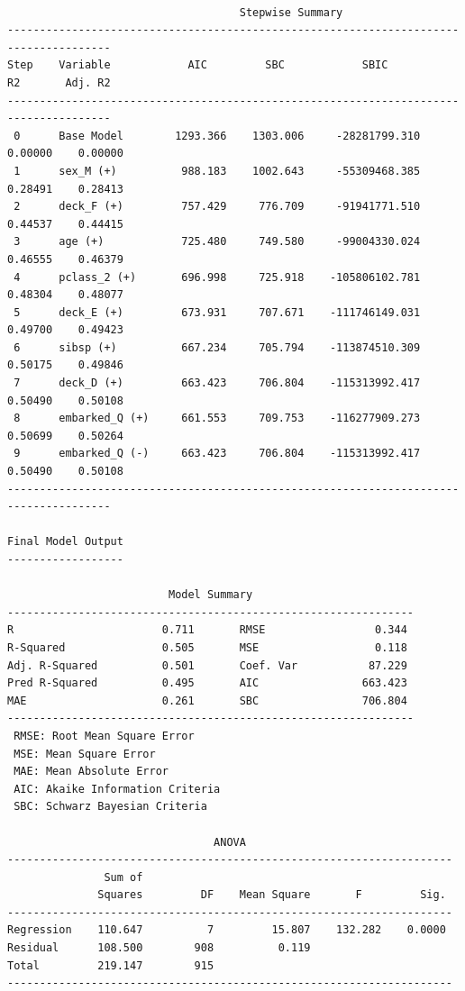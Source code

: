 \documentclass[
  letterpaper,
  DIV=11,
  numbers=noendperiod]{scrartcl}
\begin{document}
\begin{verbatim}

                                    Stepwise Summary                                    
--------------------------------------------------------------------------------------
Step    Variable            AIC         SBC            SBIC           R2       Adj. R2 
--------------------------------------------------------------------------------------
 0      Base Model        1293.366    1303.006     -28281799.310    0.00000    0.00000 
 1      sex_M (+)          988.183    1002.643     -55309468.385    0.28491    0.28413 
 2      deck_F (+)         757.429     776.709     -91941771.510    0.44537    0.44415 
 3      age (+)            725.480     749.580     -99004330.024    0.46555    0.46379 
 4      pclass_2 (+)       696.998     725.918    -105806102.781    0.48304    0.48077 
 5      deck_E (+)         673.931     707.671    -111746149.031    0.49700    0.49423 
 6      sibsp (+)          667.234     705.794    -113874510.309    0.50175    0.49846 
 7      deck_D (+)         663.423     706.804    -115313992.417    0.50490    0.50108 
 8      embarked_Q (+)     661.553     709.753    -116277909.273    0.50699    0.50264 
 9      embarked_Q (-)     663.423     706.804    -115313992.417    0.50490    0.50108 
--------------------------------------------------------------------------------------

Final Model Output 
------------------

                         Model Summary                          
---------------------------------------------------------------
R                       0.711       RMSE                 0.344 
R-Squared               0.505       MSE                  0.118 
Adj. R-Squared          0.501       Coef. Var           87.229 
Pred R-Squared          0.495       AIC                663.423 
MAE                     0.261       SBC                706.804 
---------------------------------------------------------------
 RMSE: Root Mean Square Error 
 MSE: Mean Square Error 
 MAE: Mean Absolute Error 
 AIC: Akaike Information Criteria 
 SBC: Schwarz Bayesian Criteria 

                                ANOVA                                 
---------------------------------------------------------------------
               Sum of                                                
              Squares         DF    Mean Square       F         Sig. 
---------------------------------------------------------------------
Regression    110.647          7         15.807    132.282    0.0000 
Residual      108.500        908          0.119                      
Total         219.147        915                                     
---------------------------------------------------------------------


\end{verbatim}
\end{document}
